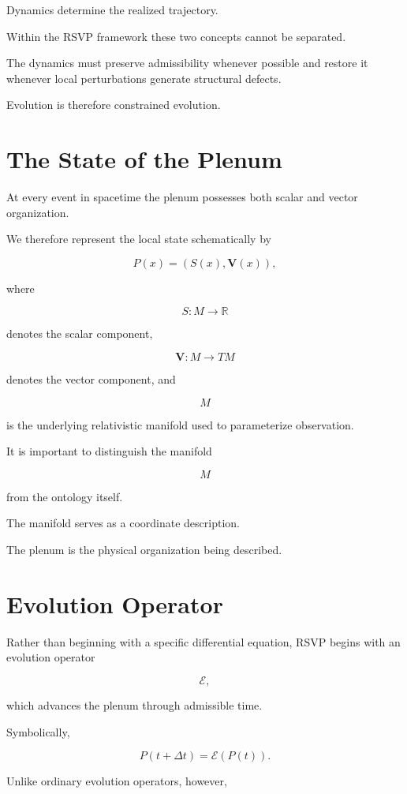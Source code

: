 \documentclass[11pt,oneside]{book}
\numberwithin{equation}{chapter}
\theoremstyle{definition}
\theoremstyle{plain}
\begin{document}
Dynamics determine the realized trajectory.

Within the RSVP framework these two concepts cannot be separated.

The dynamics must preserve admissibility whenever possible and restore it
whenever local perturbations generate structural defects.

Evolution is therefore constrained evolution.

\section{The State of the Plenum}

At every event in spacetime the plenum possesses both scalar and vector
organization.

We therefore represent the local state schematically by

\[
P(x)=
\left(
S(x),
\mathbf{V}(x)
\right),
\]

where

\[
S : M \rightarrow \mathbb{R}
\]

denotes the scalar component,

\[
\mathbf{V} : M \rightarrow TM
\]

denotes the vector component, and

\[
M
\]

is the underlying relativistic manifold used to parameterize observation.

It is important to distinguish the manifold

\[
M
\]

from the ontology itself.

The manifold serves as a coordinate description.

The plenum is the physical organization being described.

\section{Evolution Operator}

Rather than beginning with a specific differential equation, RSVP begins
with an evolution operator

\[
\mathcal{E},
\]

which advances the plenum through admissible time.

Symbolically,

\[
P(t+\Delta t)
=
\mathcal{E}
\left(
P(t)
\right).
\]

Unlike ordinary evolution operators, however,
\end{document}
